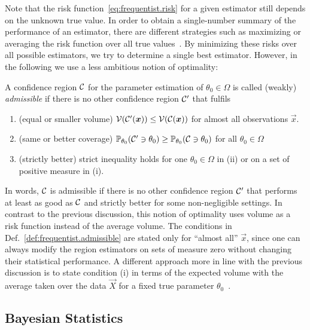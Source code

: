 Note that the risk function~\eqref{eq:frequentist.risk} for a given estimator still depends on the unknown true value.
In order to obtain a single-number summary of the performance of an estimator, there are different strategies such as maximizing or averaging the risk function over all true values~\cite[Sec.\ 12.2]{Wasserman_2013_All}.
By minimizing these risks over all possible estimators, we try to determine a single best estimator.
However, in the following we use a less ambitious notion of optimality:
\begin{definition}{\cite[Def. 2.2]{Joshi_1969_Admissibility}}
  \label{def:frequentist.admissible}
  A confidence region $\mathcal{C}$ for the parameter estimation of $\theta_0 \in \Omega$ is called (weakly) \emph{admissible} if there is no other confidence region $\mathcal{C}'$ that fulfils
  \begin{enumerate}
    \item(equal or smaller volume) $\mathcal{V}(\mathcal{C}'(\boldsymbol{x})) \le \mathcal{V}(\mathcal{C}(\boldsymbol{x}))$ for almost all observations $\vec x$.
    \item(same or better coverage) $\mathbb{P}_{\theta_0}(\mathcal{C}' \owns \theta_0) \ge \mathbb{P}_{\theta_0}(\mathcal{C} \owns \theta_0)$ for all $\theta_0 \in \Omega$
    \item(strictly better) strict inequality holds for one $\theta_0 \in \Omega$ in (ii) or on a set of positive measure in (i).
  \end{enumerate}
\end{definition}
In words, $\mathcal{C}$ is admissible if there is no other confidence region $\mathcal{C}'$ that performs at least as good as $\mathcal{C}$ and strictly better for some non-negligible settings.
In contrast to the previous discussion, this notion of optimality uses  volume as a risk function instead of the average volume.
The conditions in Def.~\ref{def:frequentist.admissible} are stated only for ``almost all'' $\vec x$, since one can always modify the region estimators on sets of measure zero without changing their statistical performance.
A different approach more in line with the previous discussion is to state condition (i) in terms of the expected volume with the average taken over the data $\vec X$ for a fixed true parameter $\theta_0$~\cite[Def.~7.1]{Joshi_1969_Admissibility}.




\subsection{Bayesian Statistics}
\label{sub:intro.bayesian}


